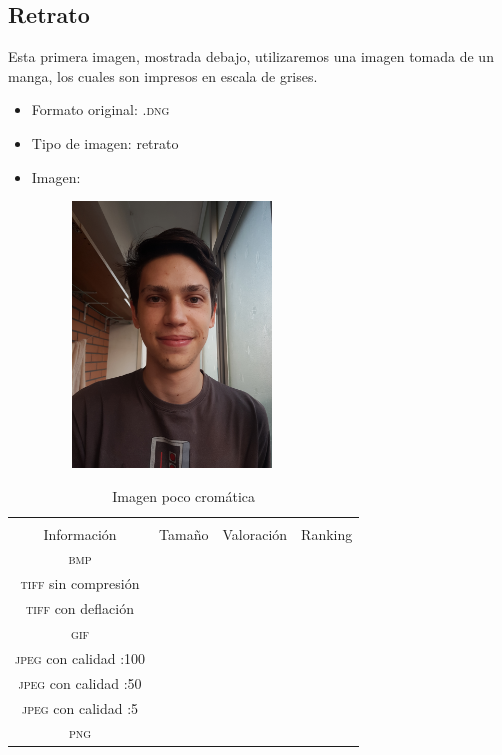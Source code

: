 \documentclass[11pt,a4paper]{article}
\begin{document}
\subsection{Retrato}

Esta primera imagen, mostrada debajo, utilizaremos una imagen tomada de un manga, los cuales son impresos en escala de grises.

\begin{itemize}
	\item Formato original: \textsc{.dng}
	\item Tipo de imagen: retrato
	\item Imagen:
		\begin{figure}[H]
		\centering
			\includegraphics[width=0.5\textwidth]{Fotos/retrato.jpg}
		\end{figure}	
\end{itemize}

\begin{table}[H]
\centering
\begin{tabular}{|c|c|c|c|}
\hline
\diagbox[width=15em]{\textit{Códec}/Formato}{\\Información} & Tamaño & Valoración & Ranking \\
\hline
\textsc{bmp} &  &  &  \\ \hline
\textsc{tiff} sin compresión &  &  &  \\ \hline
\textsc{tiff} con deflación &  &  &  \\ \hline
\textsc{gif} &  &  &  \\ \hline
\textsc{jpeg} con calidad :100 &  &  &  \\ \hline
\textsc{jpeg} con calidad :50 &  &  &  \\ \hline
\textsc{jpeg} con calidad :5 &  &  &  \\ \hline
\textsc{png} &  &  &  \\ \hline
\end{tabular}
\caption{Imagen poco cromática}
\label{tab:my-table}
\end{table}
\end{document}
